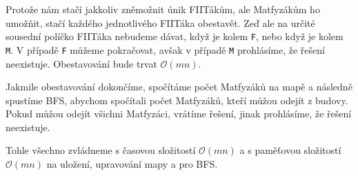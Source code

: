 \documentclass{fkssolpub}
\author{Ondřej Sedláček}
\begin{document}
Protože nám stačí jakkoliv zněmožnit únik FIITákům, ale Matfyzákům ho umožňit,
stačí každého jednotlivého FIITáka obestavět. Zeď ale na určité sousední políčko
FIITáka nebudeme dávat, když je kolem \verb|F|, nebo když je kolem \verb|M|.
V případě \verb|F| můžeme pokračovat, avšak v případě \verb|M| prohlásíme, že
řešení neexistuje. Obestavování bude trvat $\mathcal{O}(mn)$.

Jakmile obestavování dokončíme, spočítáme počet Matfyzáků na mapě a následně
spustíme BFS, abychom spočítali počet Matfyzáků, kteří můžou odejít z budovy.
Pokud můžou odejít všichni Matfyzáci, vrátíme řešení, jinak prohlásíme, že
řešení neexistuje.

Tohle všechno zvládneme s časovou složitostí $\mathcal{O}(mn)$ a s paměťovou
složitostí $\mathcal{O}(mn)$ na uložení, upravování mapy a pro BFS.
\end{document}
